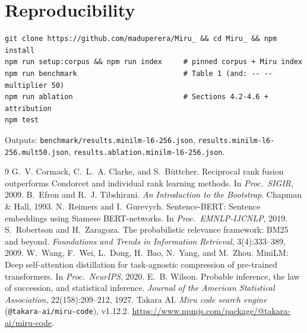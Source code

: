 \documentclass[11pt, letterpaper]{article}
\newcommand{\code}[1]{\texttt{#1}}
\begin{document}
\section*{Reproducibility}
\begin{verbatim}
git clone https://github.com/maduperera/Miru_ && cd Miru_ && npm install
npm run setup:corpus && npm run index     # pinned corpus + Miru index
npm run benchmark                         # Table 1 (and: -- --multiplier 50)
npm run ablation                          # Sections 4.2-4.6 + attribution
npm test
\end{verbatim}
Outputs: \code{benchmark/results.minilm-l6-256.json}, \code{results.minilm-l6-256.mult50.json},
\code{results.ablation.minilm-l6-256.json}.

\begin{thebibliography}{9}
 G.~V. Cormack, C.~L.~A. Clarke, and S.~B\"uttcher. Reciprocal rank fusion outperforms
  Condorcet and individual rank learning methods. In \emph{Proc.\ SIGIR}, 2009.
 B.~Efron and R.~J. Tibshirani. \emph{An Introduction to the Bootstrap}. Chapman \& Hall,
  1993.
 N.~Reimers and I.~Gurevych. Sentence-BERT: Sentence embeddings using Siamese BERT-networks.
  In \emph{Proc.\ EMNLP-IJCNLP}, 2019.
 S.~Robertson and H.~Zaragoza. The probabilistic relevance framework: BM25 and beyond.
  \emph{Foundations and Trends in Information Retrieval}, 3(4):333--389, 2009.
 W.~Wang, F.~Wei, L.~Dong, H.~Bao, N.~Yang, and M.~Zhou. MiniLM: Deep self-attention
  distillation for task-agnostic compression of pre-trained transformers. In \emph{Proc.\ NeurIPS}, 2020.
 E.~B. Wilson. Probable inference, the law of succession, and statistical inference.
  \emph{Journal of the American Statistical Association}, 22(158):209--212, 1927.
 Takara AI. \emph{Miru code search engine} (\code{@takara-ai/miru-code}), v1.12.2.
  \url{https://www.npmjs.com/package/@takara-ai/miru-code}.
\end{thebibliography}
\end{document}
